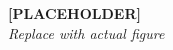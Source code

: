 \documentclass[border=10pt]{standalone}
\begin{document}
\colorbox{gray!10}{\parbox{12cm}{\centering\vspace{3cm}\textbf{\Large [PLACEHOLDER]}\\[0.5cm]\textit{Replace with actual figure}\vspace{3cm}}}
\end{document}
